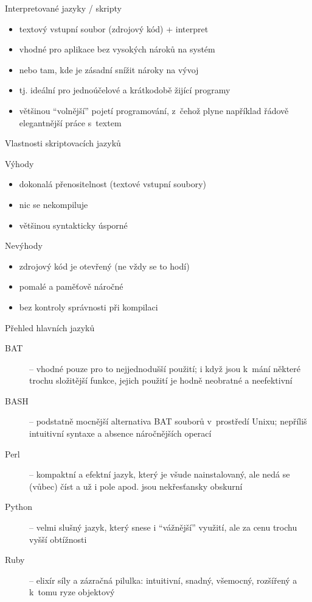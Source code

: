 \documentclass{beamer}
\begin{document}
\begin{frame}{Interpretované jazyky / skripty}
  \begin{itemize}
    \item textový vstupní soubor (zdrojový kód) + interpret
    \item vhodné pro aplikace bez vysokých nároků na systém
    \item nebo tam, kde je zásadní snížit nároky na vývoj
    \item tj. ideální pro jednoúčelové a krátkodobě žijící programy
    \item většinou ``volnější'' pojetí programování, z~čehož plyne například řádově elegantnější práce s~textem
  \end{itemize}
\end{frame}

\begin{frame}{Vlastnosti skriptovacích jazyků}
  \begin{block}{Výhody}
    \begin{itemize}
      \item dokonalá přenositelnost (textové vstupní soubory)
      \item nic se nekompiluje
      \item většinou syntakticky úsporné
    \end{itemize}
  \end{block}
  \pause
  \begin{block}{Nevýhody}
    \begin{itemize}
      \item zdrojový kód je otevřený (ne vždy se to hodí)
      \item pomalé a paměťově náročné
      \item bez kontroly správnosti při kompilaci
    \end{itemize}
  \end{block}
\end{frame}

\begin{frame}{Přehled hlavních jazyků}
  \begin{description}
    \item[BAT] -- vhodné pouze pro to nejjednodušší použití; i když jsou k~mání některé trochu složitější funkce, jejich použití je hodně neobratné a neefektivní
    \item[BASH] -- podstatně mocnější alternativa BAT souborů v~prostředí Unixu; nepříliš intuitivní syntaxe a absence náročnějších operací
    \item[Perl] -- kompaktní a efektní jazyk, který je všude nainstalovaný, ale nedá se (vůbec) číst a už i pole apod. jsou nekřesťansky obskurní
    \item[Python] -- velmi slušný jazyk, který snese i ``vážnější'' využití, ale za cenu trochu vyšší obtížnosti
    \item[Ruby] -- elixír síly a zázračná pilulka: intuitivní, snadný, všemocný, rozšířený a k~tomu ryze objektový
  \end{description}
\end{frame}
\end{document}
